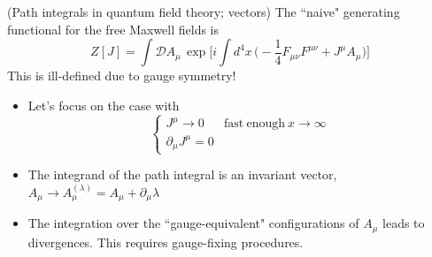 \begin{defi}
(Path integrals in quantum field theory; vectors) The ``naive" generating functional for the free Maxwell fields is
\[Z[J]=\int \mathcal{D}A_{\mu }\,\exp \Big[i\int d^{4}x\,\Big(-\dfrac{1}{4}F_{\mu \nu }F^{\mu \nu }+J^{\mu }A_{\mu }\Big)\Big]\]
This is ill-defined due to gauge symmetry!
\begin{itemize}[leftmargin=*]
\item[(i)] Let's focus on the case with
\[\begin{cases}
J^{\mu }\rightarrow 0&\mathrm{fast\ enough\ }x\rightarrow \infty \\
\partial _{\mu }J^{\mu }=0
\end{cases}\]
\item[(ii)] The integrand of the path integral is an invariant vector, $A_{\mu }\rightarrow A_{\mu }^{(\lambda )}=A_{\mu }+\partial _{\mu }\lambda $
\item[(iii)] The integration over the ``gauge-equivalent" configurations of $A_{\mu }$ leads to divergences. This requires gauge-fixing procedures.
\end{itemize}
\end{defi}
\vspace{2ex}
